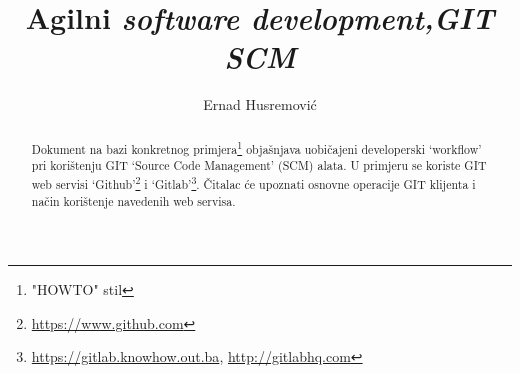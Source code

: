 \documentclass[times, utf8, seminar]{fit}
\begin{document}






\title{Agilni \em{software development},\newline GIT SCM}

\author{Ernad Husremović}


\maketitle

\tableofcontents

\newpage

\begin{abstract}

Dokument na bazi konkretnog primjera\footnote{"HOWTO" stil} objašnjava uobičajeni developerski `workflow' pri korištenju GIT `Source Code Management' (SCM) alata. 
U primjeru se koriste GIT web servisi `Github'\footnote{\url{https://www.github.com}} i `Gitlab'\footnote{\url{https://gitlab.knowhow.out.ba}, \url{http://gitlabhq.com}}.
Čitalac će upoznati osnovne operacije GIT klijenta i način korištenje navedenih web servisa.


\end{abstract}
\end{document}
